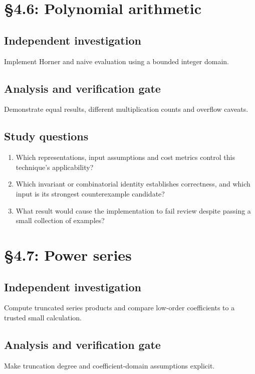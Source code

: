 \documentclass[11pt,letterpaper]{article}
\begin{document}
\section{\S 4.6: Polynomial arithmetic}
\subsection{Independent investigation}
Implement Horner and naive evaluation using a bounded integer domain.
\subsection{Analysis and verification gate}
Demonstrate equal results, different multiplication counts and overflow caveats.
\subsection{Study questions}
\begin{enumerate}
\item Which representations, input assumptions and cost metrics control this technique's applicability?
\item Which invariant or combinatorial identity establishes correctness, and which input is its strongest counterexample candidate?
\item What result would cause the implementation to fail review despite passing a small collection of examples?
\end{enumerate}

\section{\S 4.7: Power series}
\subsection{Independent investigation}
Compute truncated series products and compare low-order coefficients to a trusted small calculation.
\subsection{Analysis and verification gate}
Make truncation degree and coefficient-domain assumptions explicit.
\end{document}
